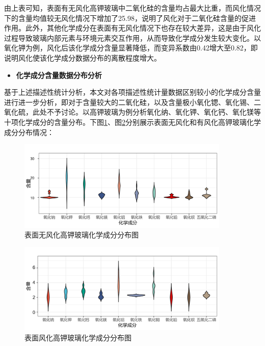 \documentclass[withoutpreface,bwprint]{cumcmthesis} %
\begin{document}
由上表可知，表面有无风化高钾玻璃中二氧化硅的含量均占最大比重，而风化情况下的含量均值较无风化情况下增加了25.98，说明了风化对于二氧化硅含量的促进作用。此外，其他化学成分在表面有无风化情况下也存在较大差异，这是由于风化过程导致玻璃内部元素与环境元素交互作用，从而导致化学成分发生较大变化。以氧化钾为例，风化后该化学成分含量显著降低，而变异系数由0.42增大至0.82，即说明风化使该化学成分数据分布的离散程度增大。

\begin{itemize}
	\item \textbf{化学成分含量数据分布分析}
\end{itemize}

基于上述描述性统计分析，本文对各项描述性统计量数据区别较小的化学成分含量进行进一步分析，即对于含量较大的二氧化硅，以及含量极小氧化锶、氧化锡、二氧化硫，此处不予讨论。以高钾玻璃为例分析氧化纳、氧化钾、氧化钙、氧化镁等十项化学成分的含量分布。下图\ref{wufenghua}、图\ref{fenghua}分别展示表面无风化和有风化高钾玻璃化学成分分布情况：

\begin{figure}[H]
\centering
\includegraphics[width=0.9\textwidth]{figure/小提琴}
\caption{表面无风化高钾玻璃化学成分分布图}
\label{wufenghua}
\end{figure}

\begin{figure}[H]
\centering
\includegraphics[width=0.9\textwidth]{figure/风化}
\caption{表面风化高钾玻璃化学成分分布图}
\label{fenghua}
\end{figure}
\end{document}
